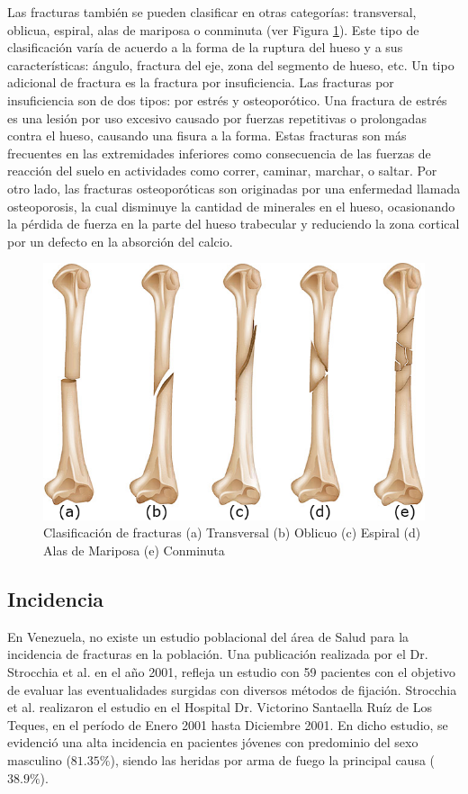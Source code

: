 Las fracturas tambi\'en se pueden clasificar en otras categor\'ias: transversal, oblicua, espiral, alas de mariposa o conminuta (ver Figura \ref{fig:fracture2}). Este tipo de clasificaci\'on var\'ia de acuerdo a la forma de la ruptura del hueso y a sus caracter\'isticas: \'angulo, fractura del eje, zona del segmento de hueso, etc. Un tipo adicional de fractura es la fractura por insuficiencia. Las fracturas por insuficiencia son de dos tipos: por estr\'es y osteopor\'otico. Una fractura de estr\'es es una lesi\'on por uso excesivo causado por fuerzas repetitivas o prolongadas contra el hueso, causando una fisura a la forma. Estas fracturas son m\'as frecuentes en las extremidades inferiores como consecuencia de las fuerzas de reacci\'on del suelo en actividades como correr, caminar, marchar, o saltar. Por otro lado, las fracturas osteopor\'oticas son originadas por una enfermedad llamada osteoporosis, la cual disminuye la cantidad de minerales en el hueso, ocasionando la p\'erdida de fuerza en la parte del hueso trabecular y reduciendo la zona cortical por un defecto en la absorci\'on del calcio.

\begin{figure}[htb]
	\centering
		\includegraphics[width=0.50\columnwidth]{images/fracture2.png}
		\caption{Clasificaci\'on de fracturas (a) Transversal (b) Oblicuo (c) Espiral (d) Alas de Mariposa (e) Conminuta}
	\label{fig:fracture2}
\end{figure}

\subsection{Incidencia}

En Venezuela, no existe un estudio poblacional del \'area de Salud para la incidencia de fracturas en la poblaci\'on. Una publicaci\'on realizada por el Dr. Strocchia et al. \cite{STRO01} en el a\~no 2001, refleja un estudio con 59 pacientes con el objetivo de evaluar las eventualidades surgidas con diversos m\'etodos de fijaci\'on. Strocchia et al. \cite{STRO01} realizaron el estudio en el Hospital Dr. Victorino Santaella Ru\'iz de Los Teques, en el per\'iodo de Enero 2001 hasta Diciembre 2001. En dicho estudio, se evidenci\'o una alta incidencia en pacientes j\'ovenes con predominio del sexo masculino ($81.35\%$), siendo las heridas por arma de fuego la principal causa ($38.9\%$).

